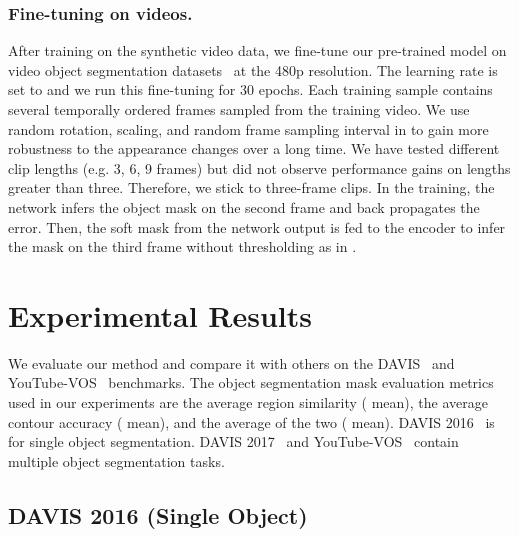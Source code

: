 \documentclass[runningheads]{llncs}
\begin{document}
\subsubsection{Fine-tuning on videos.}
After training on the synthetic video data, we fine-tune our pre-trained model on video object segmentation datasets~\cite{davis2016,davis2017} at the 480p resolution. The learning rate is set to  and we run this fine-tuning for 30 epochs. Each training sample contains several temporally ordered frames sampled from the training video. We use random rotation, scaling, and random frame sampling interval in  to gain more robustness to the appearance changes over a long time. We have tested different clip lengths (e.g. 3, 6, 9 frames) but did not observe performance gains on lengths greater than three. Therefore, we stick to three-frame clips. In the training, the network infers the object mask on the second frame and back propagates the error. Then, the soft mask from the network output is fed to the encoder to infer the mask on the third frame without thresholding as in \cite{stm}.

\section{Experimental Results}
\label{sec:exp}

We evaluate our method and compare it with others on the DAVIS~\cite{davis2016,davis2017} and YouTube-VOS~\cite{youtubevos} benchmarks. The object segmentation mask evaluation metrics used in our experiments are the average region similarity ( mean), the average contour accuracy ( mean), and the average of the two ( mean). DAVIS 2016~\cite{davis2016} is for single object segmentation. DAVIS 2017~\cite{davis2017} and YouTube-VOS~\cite{youtubevos} contain multiple object segmentation tasks.

\subsection{DAVIS 2016 (Single Object)}
\end{document}
